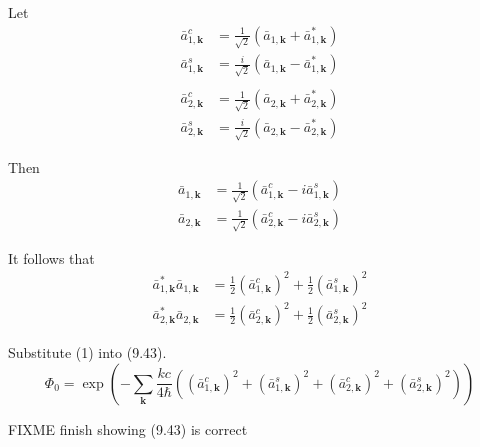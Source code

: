 


Let
\begin{align*}
\bar a_{1,\mathbf k}^c&=\frac{1}{\sqrt2}(\bar a_{1,\mathbf k}+\bar a_{1,\mathbf k}^*)
\\
\bar a_{1,\mathbf k}^s&=\frac{i}{\sqrt2}(\bar a_{1,\mathbf k}-\bar a_{1,\mathbf k}^*)
\\
\\
\bar a_{2,\mathbf k}^c&=\frac{1}{\sqrt2}(\bar a_{2,\mathbf k}+\bar a_{2,\mathbf k}^*)
\\
\bar a_{2,\mathbf k}^s&=\frac{i}{\sqrt2}(\bar a_{2,\mathbf k}-\bar a_{2,\mathbf k}^*)
\end{align*}

Then
\begin{align*}
\bar a_{1,\mathbf k}&=\frac{1}{\sqrt2}(\bar a_{1,\mathbf k}^c-i\bar a_{1,\mathbf k}^s)
\\
\bar a_{2,\mathbf k}&=\frac{1}{\sqrt2}(\bar a_{2,\mathbf k}^c-i\bar a_{2,\mathbf k}^s)
\end{align*}

It follows that
\begin{equation*}
\begin{aligned}
\bar a_{1,\mathbf k}^*\bar a_{1,\mathbf k}
&=\frac{1}{2}(\bar a_{1,\mathbf k}^c)^2+\frac{1}{2}(\bar a_{1,\mathbf k}^s)^2
\\
\bar a_{2,\mathbf k}^*\bar a_{2,\mathbf k}
&=\frac{1}{2}(\bar a_{2,\mathbf k}^c)^2+\frac{1}{2}(\bar a_{2,\mathbf k}^s)^2
\end{aligned}
\tag{1}
\end{equation*}

Substitute (1) into (9.43).
\begin{equation*}
\Phi_0=\exp\left(
-\sum_{\mathbf k}
\frac{kc}{4\hbar}
\left(
(\bar a_{1,\mathbf k}^c)^2+(\bar a_{1,\mathbf k}^s)^2
+
(\bar a_{2,\mathbf k}^c)^2+(\bar a_{2,\mathbf k}^s)^2
\right)
\right)
\end{equation*}

FIXME finish showing (9.43) is correct



